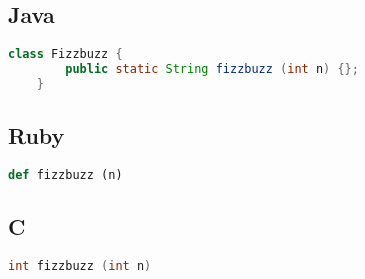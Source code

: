 \documentclass[a4paper]{article}
\begin{document}
\subsection*{Java}
\begin{lstlisting}[language=Java]
	class Fizzbuzz {
		public static String fizzbuzz (int n) {};
	}
\end{lstlisting}
\subsection*{Ruby}
\begin{lstlisting}[language=Ruby]
	def fizzbuzz (n)
\end{lstlisting}
\subsection*{C}
\begin{lstlisting}[language=C]
	int fizzbuzz (int n)
\end{lstlisting}
\end{document}

